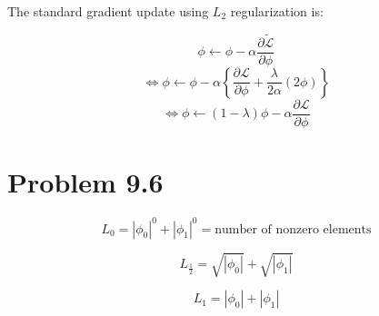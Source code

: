\documentclass{article}
\begin{document}
The standard gradient update using \(L_2\) regularization is:

\[
\phi \gets \phi - \alpha \frac{\partial \tilde{\mathcal{L}}}{\partial \phi}
\]
\[
\Leftrightarrow \phi \gets \phi - \alpha \left\{\frac{\partial \mathcal{L}}{\partial \phi} + \frac{\lambda}{2\alpha} (2\phi)\right\}
\]
\[
\Leftrightarrow \phi \gets (1 - \lambda)\phi - \alpha \frac{\partial \mathcal{L}}{\partial \phi}
\]

\section*{Problem 9.6}

\[
L_0 = |\phi_0|^0 + |\phi_1|^0 = \text{number of nonzero elements}
\]

\[
L_{\frac{1}{2}} = \sqrt{|\phi_0|} + \sqrt{|\phi_1|}
\]

\[
L_1 = |\phi_0| + |\phi_1|
\]
\end{document}
